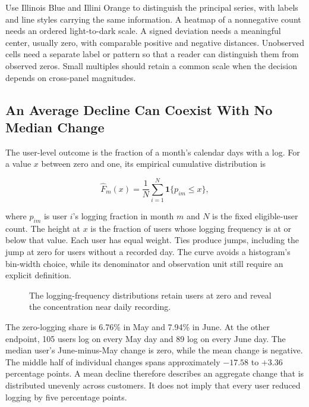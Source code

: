 Use Illinois Blue and Illini Orange to distinguish the principal series,
with labels and line styles carrying the same information. A heatmap of
a nonnegative count needs an ordered light-to-dark scale. A signed
deviation needs a meaningful center, usually zero, with comparable
positive and negative distances. Unobserved cells need a separate label
or pattern so that a reader can distinguish them from observed zeros.
Small multiples should retain a common scale when the decision depends
on cross-panel magnitudes.

\hypertarget{M02-an-average-decline-can-coexist-with-no-median-change}{%
\subsection{An Average Decline Can Coexist With No Median
Change}\label{M02-an-average-decline-can-coexist-with-no-median-change}}

\noindent The user-level outcome is the fraction of a month's calendar days with a
log. For a value \(x\) between zero and one, its empirical cumulative
distribution is

\[
\widehat F_m(x)=\frac{1}{N}\sum_{i=1}^{N}\mathbf{1}\{p_{im}\leq x\},
\]

where \(p_{im}\) is user \(i\)'s logging fraction in month \(m\) and
\(N\) is the fixed eligible-user count. The height at \(x\) is the
fraction of users whose logging frequency is at or below that value.
Each user has equal weight. Ties produce jumps, including the jump at
zero for users without a recorded day. The curve avoids a histogram's
bin-width choice, while its denominator and observation unit still
require an explicit definition.

\begin{figure}[htbp]
\centering

\caption{The logging-frequency distributions retain users at zero and reveal the concentration near daily recording.}\label{fig:M02_logging_distribution}
\end{figure}

The zero-logging share is 6.76\% in May and 7.94\% in June. At the other
endpoint, 105 users log on every May day and 89 log on every June day.
The median user's June-minus-May change is zero, while the mean change
is negative. The middle half of individual changes spans approximately
\(-17.58\) to \(+3.36\) percentage points. A mean decline therefore
describes an aggregate change that is distributed unevenly across
customers. It does not imply that every user reduced logging by five
percentage points.

